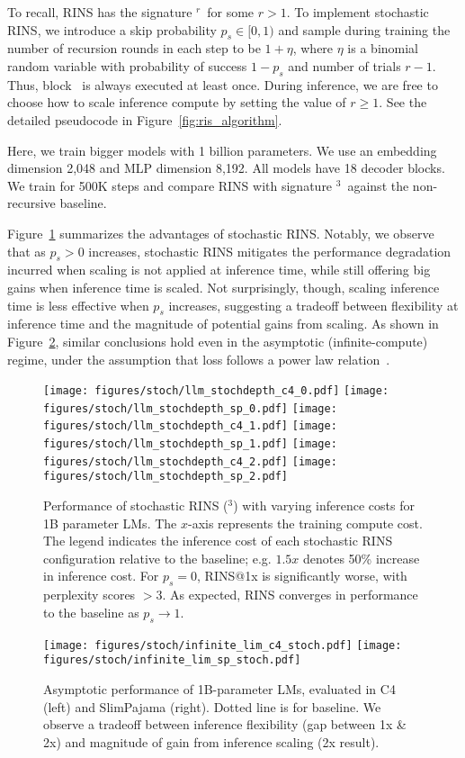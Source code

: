 To recall, RINS has the signature \A$^r$\B\ for some $r>1$. To implement stochastic RINS, we introduce a skip probability $p_s\in[0, 1)$ and sample during training the number of recursion rounds in each step to be $1+\eta$, where $\eta$ is a binomial random variable with probability of success $1-p_s$ and number of trials $r-1$. Thus, block \A\ is always executed at least once. During inference, we are free to choose how to scale inference compute by setting the value of $r\ge 1$. See the detailed pseudocode in Figure~\ref{fig:ris_algorithm}.


Here, we train bigger models with 1 billion parameters. We use an embedding dimension 2,048 and MLP dimension 8,192. All models have 18 decoder blocks. We train for 500K steps and compare RINS with signature \A$^3$\B\ against the non-recursive baseline.

Figure~\ref{fig:stoch_lm} summarizes the advantages of stochastic RINS. Notably, we observe that as $p_s>0$ increases, stochastic RINS mitigates the performance degradation incurred when scaling is not applied at inference time, while still offering big gains when inference time is scaled. Not surprisingly, though, scaling inference time is less effective when $p_s$ increases, suggesting a tradeoff between flexibility at inference time and the magnitude of potential gains from scaling. As shown in Figure~\ref{fig:infinite_lim}, similar conclusions hold even in the asymptotic (infinite-compute) regime, under the assumption that loss follows a power law relation~\cite{kaplan2020scaling}.


\begin{figure}[t]
    \centering
    \texttt{[image: figures/stoch/llm\_stochdepth\_c4\_0.pdf]}
    \texttt{[image: figures/stoch/llm\_stochdepth\_sp\_0.pdf]}
    \texttt{[image: figures/stoch/llm\_stochdepth\_c4\_1.pdf]}
    \texttt{[image: figures/stoch/llm\_stochdepth\_sp\_1.pdf]}
    \texttt{[image: figures/stoch/llm\_stochdepth\_c4\_2.pdf]}
    \texttt{[image: figures/stoch/llm\_stochdepth\_sp\_2.pdf]}
    \caption{Performance of stochastic RINS (\A$^3$\B) with varying inference costs for 1B parameter LMs. The $x$-axis represents the training compute cost. The legend indicates the inference cost of each stochastic RINS configuration relative to the baseline; e.g. $1.5x$ denotes 50\% increase in inference cost. For $p_s=0$, RINS@1x is significantly worse, with perplexity scores $>3$. As expected,  RINS converges in performance to the baseline as $p_s\to 1$.}
    \label{fig:stoch_lm}
\end{figure}

\begin{figure}[t]
    \centering
    \texttt{[image: figures/stoch/infinite\_lim\_c4\_stoch.pdf]}
    \texttt{[image: figures/stoch/infinite\_lim\_sp\_stoch.pdf]}
    \caption{Asymptotic performance of 1B-parameter LMs, evaluated in C4 (left) and SlimPajama (right). Dotted line is for baseline. We observe a tradeoff between inference flexibility (gap between 1x \& 2x) and magnitude of gain from inference scaling (2x result).}
    \label{fig:infinite_lim}
\end{figure}
